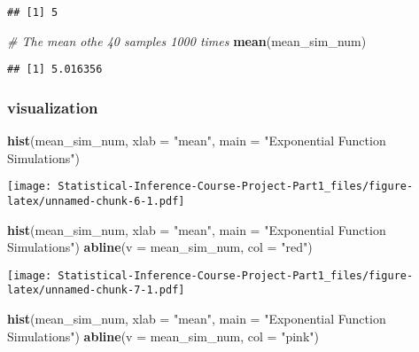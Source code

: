 \documentclass[
]{article}
\newenvironment{Shaded}{\begin{snugshade}}{\end{snugshade}}
\newcommand{\CommentTok}[1]{\textcolor[rgb]{0.56,0.35,0.01}{\textit{#1}}}
\newcommand{\DataTypeTok}[1]{\textcolor[rgb]{0.13,0.29,0.53}{#1}}
\newcommand{\KeywordTok}[1]{\textcolor[rgb]{0.13,0.29,0.53}{\textbf{#1}}}
\newcommand{\NormalTok}[1]{#1}
\newcommand{\StringTok}[1]{\textcolor[rgb]{0.31,0.60,0.02}{#1}}
\begin{document}
\begin{verbatim}
## [1] 5
\end{verbatim}

\begin{Shaded}
\begin{Highlighting}[]
\CommentTok{\# The mean othe 40 samples 1000 times}
\KeywordTok{mean}\NormalTok{(mean\_sim\_num)}
\end{Highlighting}
\end{Shaded}

\begin{verbatim}
## [1] 5.016356
\end{verbatim}

\hypertarget{visualization}{%
\subsubsection{visualization}\label{visualization}}

\begin{Shaded}
\begin{Highlighting}[]
\KeywordTok{hist}\NormalTok{(mean\_sim\_num, }\DataTypeTok{xlab =} \StringTok{"mean"}\NormalTok{, }\DataTypeTok{main =} \StringTok{"Exponential Function Simulations"}\NormalTok{)}
\end{Highlighting}
\end{Shaded}

\texttt{[image: Statistical-Inference-Course-Project-Part1\_files/figure-latex/unnamed-chunk-6-1.pdf]}

\begin{Shaded}
\begin{Highlighting}[]
\KeywordTok{hist}\NormalTok{(mean\_sim\_num, }\DataTypeTok{xlab =} \StringTok{"mean"}\NormalTok{, }\DataTypeTok{main =} \StringTok{"Exponential Function Simulations"}\NormalTok{)}
\KeywordTok{abline}\NormalTok{(}\DataTypeTok{v =}\NormalTok{ mean\_sim\_num, }\DataTypeTok{col =} \StringTok{"red"}\NormalTok{)}
\end{Highlighting}
\end{Shaded}

\texttt{[image: Statistical-Inference-Course-Project-Part1\_files/figure-latex/unnamed-chunk-7-1.pdf]}

\begin{Shaded}
\begin{Highlighting}[]
\KeywordTok{hist}\NormalTok{(mean\_sim\_num, }\DataTypeTok{xlab =} \StringTok{"mean"}\NormalTok{, }\DataTypeTok{main =} \StringTok{"Exponential Function Simulations"}\NormalTok{)}
\KeywordTok{abline}\NormalTok{(}\DataTypeTok{v =}\NormalTok{ mean\_sim\_num, }\DataTypeTok{col =} \StringTok{"pink"}\NormalTok{)}
\end{Highlighting}
\end{Shaded}
\end{document}
